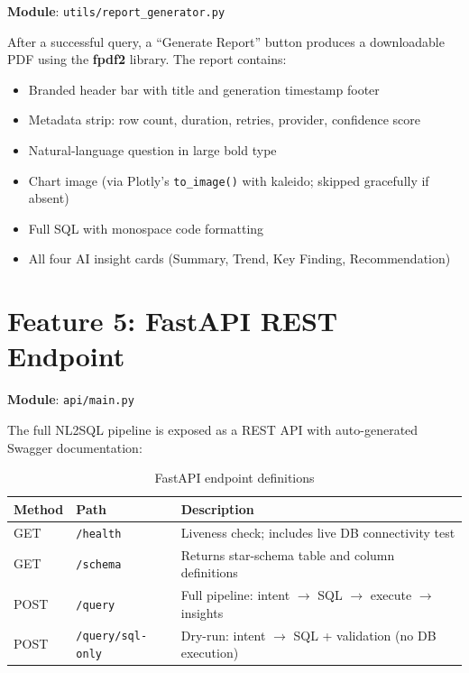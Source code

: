 \documentclass[12pt,a4paper]{report}
\begin{document}
\textbf{Module}: \texttt{utils/report\_generator.py}

After a successful query, a ``Generate Report'' button produces a downloadable PDF using the
\textbf{fpdf2} library. The report contains:

\begin{itemize}
  \item Branded header bar with title and generation timestamp footer
  \item Metadata strip: row count, duration, retries, provider, confidence score
  \item Natural-language question in large bold type
  \item Chart image (via Plotly's \texttt{to\_image()} with kaleido; skipped gracefully if absent)
  \item Full SQL with monospace code formatting
  \item All four AI insight cards (Summary, Trend, Key Finding, Recommendation)
\end{itemize}

\section{Feature 5: FastAPI REST Endpoint}

\textbf{Module}: \texttt{api/main.py}

The full NL2SQL pipeline is exposed as a REST API with auto-generated Swagger documentation:

\begin{table}[H]
  \centering
  \caption{FastAPI endpoint definitions}
  \label{tab:api}
  \renewcommand{\arraystretch}{1.3}
  \begin{tabularx}{\textwidth}{llX}
    \toprule
    \textbf{Method} & \textbf{Path} & \textbf{Description} \\
    \midrule
    GET  & \texttt{/health}         & Liveness check; includes live DB connectivity test \\
    GET  & \texttt{/schema}         & Returns star-schema table and column definitions \\
    POST & \texttt{/query}          & Full pipeline: intent $\to$ SQL $\to$ execute $\to$ insights \\
    POST & \texttt{/query/sql-only} & Dry-run: intent $\to$ SQL + validation (no DB execution) \\
    \bottomrule
  \end{tabularx}
\end{table}
\end{document}
